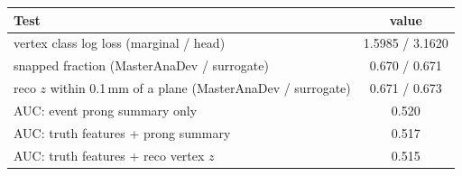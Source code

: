 \begin{tabular}{lc}
\toprule
Test & value \\
\midrule
vertex class log loss (marginal / head) & 1.5985 / 3.1620 \\
snapped fraction (MasterAnaDev / surrogate) & 0.670 / 0.671 \\
reco $z$ within 0.1\,mm of a plane (MasterAnaDev / surrogate) & 0.671 / 0.673 \\
\midrule
AUC: event prong summary only & 0.520 \\
AUC: truth features + prong summary & 0.517 \\
AUC: truth features + reco vertex $z$ & 0.515 \\
\bottomrule
\end{tabular}

